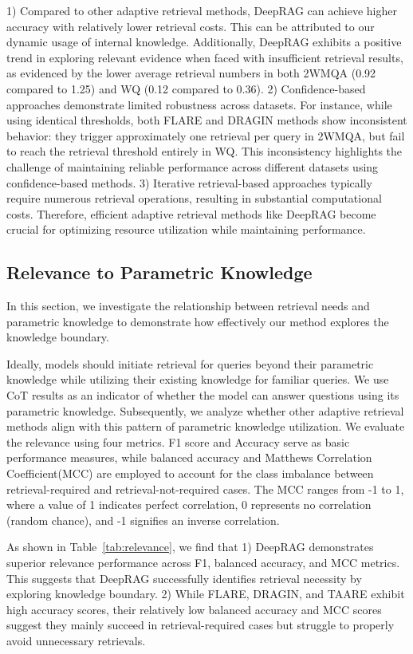 1) Compared to other adaptive retrieval methods, DeepRAG can achieve higher accuracy with relatively lower retrieval costs. This can be attributed to our dynamic usage of internal knowledge.
Additionally, DeepRAG exhibits a positive trend in exploring relevant evidence when faced with insufficient retrieval results, as evidenced by the lower average retrieval numbers in both 2WMQA (0.92 compared to 1.25) and WQ (0.12 compared to 0.36).
% 
2) Confidence-based approaches demonstrate limited robustness across datasets.  
For instance, while using identical thresholds, both FLARE and DRAGIN methods show inconsistent behavior: they trigger approximately one retrieval per query in 2WMQA, but fail to reach the retrieval threshold entirely in WQ. This inconsistency highlights the challenge of maintaining reliable performance across different datasets using confidence-based methods.
% 
3) Iterative retrieval-based approaches typically require numerous retrieval operations, resulting in substantial computational costs. Therefore, efficient adaptive retrieval methods like DeepRAG become crucial for optimizing resource utilization while maintaining performance.




\subsection{Relevance to Parametric Knowledge}
\label{relevance}
In this section, we investigate the relationship between retrieval needs and parametric knowledge to demonstrate how effectively our method explores the knowledge boundary.


Ideally, models should initiate retrieval for queries beyond their parametric knowledge while utilizing their existing knowledge for familiar queries. We use CoT results as an indicator of whether the model can answer questions using its parametric knowledge. Subsequently, we analyze whether other adaptive retrieval methods align with this pattern of parametric knowledge utilization.
% 
We evaluate the relevance using four metrics. F1 score and Accuracy serve as basic performance measures, while balanced accuracy and Matthews Correlation Coefficient(MCC) are employed to account for the class imbalance between retrieval-required and retrieval-not-required cases. The MCC ranges from -1 to 1, where a value of 1 indicates perfect correlation, 0 represents no correlation (random chance), and -1 signifies an inverse correlation.

As shown in Table~\ref{tab:relevance}, we find that 1) 
DeepRAG demonstrates superior relevance performance across F1, balanced accuracy, and MCC metrics. 
This suggests that DeepRAG successfully identifies retrieval necessity by exploring knowledge boundary.
% 
2) While FLARE, DRAGIN, and TAARE exhibit high accuracy scores, their relatively low balanced accuracy and MCC scores suggest they mainly succeed in retrieval-required cases but struggle to properly avoid unnecessary retrievals.




